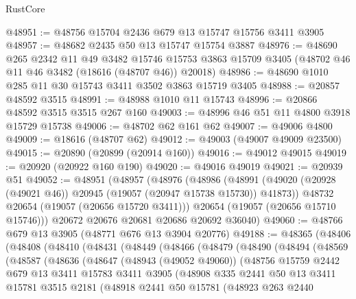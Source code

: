 \begin{lexlean}{RustCore}
\begin{coremodule}
@48951 := @48756 @15704 @2436 @679 @13 @15747 @15756 @3411 @3905
@48957 := @48682 @2435 @50 @13 @15747 @15754 @3887
@48976 := @48690
    @265
    @2342
    @11
    @49
    @3482
    @15746
    @15753
    @3863
    @15709
    @3405
    (@48702 @46 @11 @46 @3482 (@18616 (@48707 @46)) @20018)
@48986 := @48690 @1010 @285 @11 @30 @15743 @3411 @3502 @3863 @15719 @3405
@48988 := @20857 @48592 @3515
@48991 := @48988 @1010 @11 @15743
@48996 := @20866 @48592 @3515 @3515 @267 @160
@49003 := @48996 @46 @51 @11 @4800 @3918 @15729 @15738
@49006 := @48702 @62 @161 @62
@49007 := @49006 @4800
@49009 := @18616 (@48707 @62)
@49012 := @49003 (@49007 @49009 @23500)
@49015 := @20890 (@20899 (@20914 @160))
@49016 := @49012 @49015
@49019 := @20920 (@20922 @160 @190)
@49020 := @49016 @49019
@49021 := @20939 @51
@49052 := @48951
    (@48957
      (@48976
        (@48986
          (@48991 (@49020 (@20928 (@49021 @46)) @20945 (@19057 (@20947 @15738 @15730)) @41873))
          @48732
          @20654
          (@19057 (@20656 @15720 @3411)))
        @20654
        (@19057 (@20656 @15710 @15746)))
      @20672
      @20676
      @20681
      @20686
      @20692
      @36040)
@49060 := @48766 @679 @13 @3905 (@48771 @676 @13 @3904 @20776)
@49188 := @48365
    (@48406
      (@48408
        (@48410
          (@48431
            (@48449
              (@48466
                (@48479
                  (@48490
                    (@48494
                      (@48569
                        (@48587
                          (@48636
                            (@48647
                              (@48943 (@49052 @49060))
                              (@48756
                                @15759
                                @2442
                                @679
                                @13
                                @3411
                                @15783
                                @3411
                                @3905
                                (@48908
                                  @335
                                  @2441
                                  @50
                                  @13
                                  @3411
                                  @15781
                                  @3515
                                  @2181
                                  (@48918
                                    @2441
                                    @50
                                    @15781
                                    (@48923
                                      @263
                                      @2440

\end{coremodule}
\end{lexlean}
